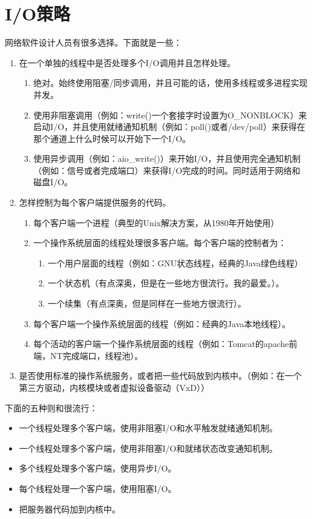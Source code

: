 \documentclass[12pt, twoside, a4paper, xetex]{report}
\begin{document}
\section*{I/O策略}

网络软件设计人员有很多选择。下面就是一些：
	\begin{enumerate}
	
		\item 在一个单独的线程中是否处理多个I/O调用并且怎样处理。
		
			\begin{enumerate}
				\item 绝对。始终使用阻塞/同步调用，并且可能的话，使用多线程或多进程实现并发。
				\item 使用非阻塞调用（例如：write()一个套接字时设置为O\_NONBLOCK）来启动I/O，并且使用就绪通知机制（例如：poll()或者/dev/poll）来获得在那个通道上什么时候可以开始下一个I/O。
				\item 使用异步调用（例如：aio\_write()）来开始I/O，并且使用完全通知机制（例如：信号或者完成端口）来获得I/O完成的时间。同时适用于网络和磁盘I/O。
			\end{enumerate}
		\item 怎样控制为每个客户端提供服务的代码。
			\begin{enumerate}
				\item 每个客户端一个进程（典型的Unix解决方案，从1980年开始使用）
				\item 一个操作系统层面的线程处理很多客户端。每个客户端的控制者为：
				\begin{enumerate}
					\item  一个用户层面的线程（例如：GNU状态线程，经典的Java绿色线程）
					\item  一个状态机（有点深奥，但是在一些地方很流行。我的最爱。）。
					\item  一个续集（有点深奥，但是同样在一些地方很流行）。
				\end{enumerate}
				\item 每个客户端一个操作系统层面的线程（例如：经典的Java本地线程）。
				\item 每个活动的客户端一个操作系统层面的线程（例如：Tomcat的apache前端，NT完成端口，线程池）。
			\end{enumerate}
		\item 是否使用标准的操作系统服务，或者把一些代码放到内核中。（例如：在一个第三方驱动，内核模块或者虚拟设备驱动（VxD））
	\end{enumerate}
	
	
下面的五种则和很流行：
	\begin{itemize}
		\item 一个线程处理多个客户端，使用非阻塞I/O和水平触发就绪通知机制。
		\item 一个线程处理多个客户端，使用非阻塞I/O和就绪状态改变通知机制。
		\item 多个线程处理多个客户端，使用异步I/O。
		\item 每个线程处理一个客户端，使用阻塞I/O。
		\item 把服务器代码加到内核中。
	\end{itemize}
	
\end{document}
